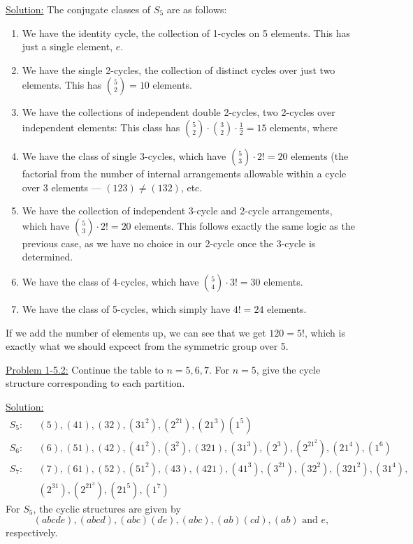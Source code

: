 \documentclass[12pt]{article}
\begin{document}
\underline{Solution:} The conjugate classes of $S_5$ are as follows:
\begin{enumerate}
    \item We have the identity cycle, the collection of 1-cycles on 5 elements.
        This has just a single element, $e$.
    \item We have the single 2-cycles, the collection of distinct cycles over
        just two elements. This has ${5 \choose 2} = 10$ elements.
    \item We have the collections of independent double 2-cycles, two 2-cycles
        over independent elements: This class has
        ${5 \choose 2} \cdot {3 \choose 2} \cdot \frac{1}{2} = 15$ elements, where
    \item We have the class of single 3-cycles, which have ${5 \choose 3}
        \cdot2! = 20$ elements (the factorial from the number of internal
        arrangements allowable within a cycle over 3 elements --- $(123) \neq
        (132)$, etc.
    \item We have the collection of independent 3-cycle and 2-cycle
        arrangements, which have ${5 \choose 3} \cdot 2! = 20$ elements. This
        follows exactly the same logic as the previous case, as we have no
        choice in our 2-cycle once the 3-cycle is determined.
    \item We have the class of 4-cycles, which have ${5 \choose 4} \cdot 3! = 30$
        elements.
    \item We have the class of 5-cycles, which simply have $4!=24$ elements.
\end{enumerate}

If we add the number of elements up, we can see that we get $120 = 5!$, which
is exactly what we should expcect from the symmetric group over 5.

\underline{Problem 1-5.2:} Continue the table to $n = 5,6,7$. For $n=5$, give
the cycle structure corresponding to each partition.

\underline{Solution:}
\begin{align*}
    S_5: \text{  }&(5),(41),(32),(31^2),(2^21),(21^3)(1^5)\\
    S_6: \text{  }&(6),(51),(42),(41^2),(3^2),(321),(31^3),(2^3),
                           (2^21^2),(21^4),(1^6)\\
    S_7: \text{  }&(7),(61),(52),(51^2),(43),(421),(41^3),(3^21), (32^2),(321^2),
    (31^4),\\&(2^31), (2^21^3),(21^5),(1^7)
\end{align*}
For $S_5$, the cyclic structures are given by 
\[
    (abcde), (abcd), (abc)(de),(abc), (ab)(cd), (ab) \text{ and } e,
\]
respectively.
\end{document}
